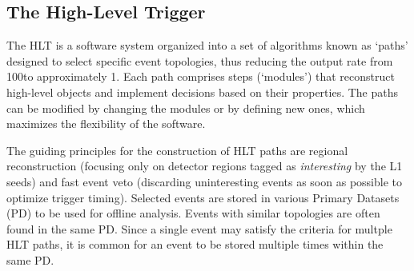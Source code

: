 \subsection{The High-Level Trigger}
\label{sec:hlt}
The HLT is a software system organized into a set of algorithms known as `paths' designed to select specific event topologies, thus reducing the output rate from 100\KHz to approximately 1\KHz.
Each path comprises steps (`modules') that reconstruct high-level objects and implement decisions based on their properties.
The paths can be modified by changing the modules or by defining new ones, which maximizes the flexibility of the software.

The guiding principles for the construction of HLT paths are regional reconstruction (\ie focusing only on detector regions tagged as \emph{interesting} by the L1 seeds)
and fast event veto (\ie discarding uninteresting events as soon as possible to optimize trigger timing).
Selected events are stored in various Primary Datasets (PD) to be used for offline analysis.
Events with similar topologies are often found in the same PD.
Since a single event may satisfy the criteria for multple HLT paths, it is common for an event to be stored multiple times within the same PD.
